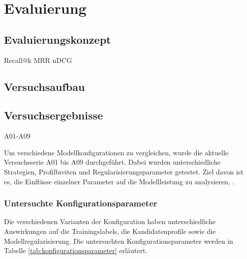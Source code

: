 \chapter{Evaluierung}
\label{chap:evaluierung}

\section{Evaluierungskonzept}

Recall@k
MRR
nDCG

\section{Versuchsaufbau}

\section{Versuchsergebnisse}

A01-A09

Um verschiedene Modellkonfigurationen zu vergleichen, wurde die aktuelle Versuchsserie A01 bis A09 durchgeführt. 
Dabei wurden unterschiedliche Strategien, Profilbreiten und Regularisierungsparameter getestet. Ziel davon ist es, die Einflüsse einzelner Parameter auf die Modellleistung zu analysieren, \parencite{LTR_Configuration_Test_Series}.

\subsection{Untersuchte Konfigurationsparameter}

Die verschiedenen Varianten der Konfiguration haben unterschiedliche Auswirkungen auf die Trainingslabels, die Kandidatenprofile sowie die Modellregularisierung. 
Die untersuchten Konfigurationsparameter werden in Tabelle \ref{tab:konfigurationsparameter} erläutert.

